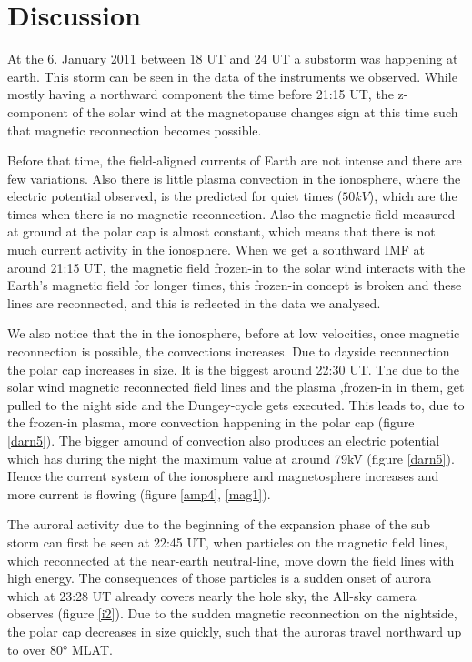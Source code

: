 \documentclass[10pt,a4paper]{article}
\begin{document}
\section{Discussion}

At the 6. January 2011 between 18 UT and 24 UT a substorm was happening at earth. This storm can be seen in the data of the instruments we observed.
While mostly having a northward component the time before 21:15 UT, the z-component of the solar wind at the magnetopause changes sign at this time such that magnetic reconnection becomes possible.

Before that time, the field-aligned currents of Earth are not intense and there are few variations. Also there is little plasma convection in the ionosphere, where the electric potential observed, is the predicted for quiet times ($50 kV$), which are the times when there is no magnetic reconnection. Also the magnetic field measured at ground at the polar cap is almost constant, which means that there is not much current activity in the ionosphere. When we get a southward IMF at around 21:15 UT, the magnetic field  frozen-in to the solar wind interacts with the Earth's magnetic field for longer times, this frozen-in concept is broken and these lines are reconnected, and this is reflected in the data we analysed.

We also notice that the in the ionosphere, before at low velocities, once magnetic reconnection is possible, the convections increases. Due to dayside reconnection the polar cap increases in size. It is the biggest around 22:30 UT. The due to the solar wind magnetic reconnected field lines and the plasma ,frozen-in in them, get pulled to the night side and the Dungey-cycle gets executed. This leads to, due to the frozen-in plasma, more convection happening in the polar cap (figure \ref{darn5}).
The bigger amound of convection also produces an electric potential which has during the night the maximum value at around 79kV (figure \ref{darn5}). Hence the current system of the ionosphere and magnetosphere increases and more current is flowing (figure \ref{amp4}, \ref{mag1}).

The auroral activity due to the beginning of the expansion phase of the sub storm can first be seen at 22:45 UT, when particles on the magnetic field lines, which reconnected at the near-earth neutral-line, move down the field lines with high energy. The consequences of those particles is a sudden onset of aurora which at 23:28 UT already covers nearly the hole sky, the All-sky camera observes (figure \ref{i2}). Due to the sudden magnetic reconnection on the nightside, the polar cap decreases in size quickly, such that the auroras travel northward up to over 80° MLAT.
\end{document}

